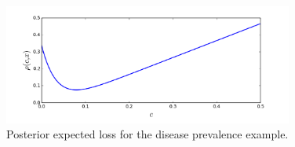 \documentclass[12pt]{article}
\begin{document}
\begin{figure}
  \begin{center}
    \includegraphics[width=0.85\textwidth]{rho.png}
  \end{center}
  \caption{Posterior expected loss for the disease prevalence example.}
  \label{figure:rho}
\end{figure}

\end{document}
